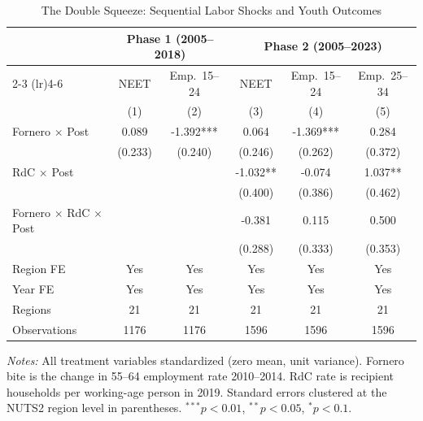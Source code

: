 \begin{table}[t]
\centering
\caption{The Double Squeeze: Sequential Labor Shocks and Youth Outcomes}
\label{tab:main}
\begin{threeparttable}
\begin{tabular}{lccccc}
\toprule
 & \multicolumn{2}{c}{Phase 1 (2005--2018)} & \multicolumn{3}{c}{Phase 2 (2005--2023)} \\
\cmidrule(lr){2-3} \cmidrule(lr){4-6}
 & NEET & Emp.~15--24 & NEET & Emp.~15--24 & Emp.~25--34 \\
 & (1) & (2) & (3) & (4) & (5) \\
\midrule
Fornero $\times$ Post & 0.089 & -1.392*** & 0.064 & -1.369*** & 0.284 \\
 & (0.233) & (0.240) & (0.246) & (0.262) & (0.372) \\
RdC $\times$ Post & &  & -1.032** & -0.074 & 1.037** \\
 & &  & (0.400) & (0.386) & (0.462) \\
Fornero $\times$ RdC $\times$ Post & &  & -0.381 & 0.115 & 0.500 \\
 & &  & (0.288) & (0.333) & (0.353) \\
\midrule
Region FE & Yes & Yes & Yes & Yes & Yes \\
Year FE & Yes & Yes & Yes & Yes & Yes \\
Regions & 21 & 21 & 21 & 21 & 21 \\
Observations & 1176 & 1176 & 1596 & 1596 & 1596 \\
\bottomrule
\end{tabular}
\begin{tablenotes}[flushleft]
\small
\item \textit{Notes:} All treatment variables standardized (zero mean, unit variance). Fornero bite is the change in 55--64 employment rate 2010--2014. RdC rate is recipient households per working-age person in 2019. Standard errors clustered at the NUTS2 region level in parentheses. $^{***}p<0.01$, $^{**}p<0.05$, $^{*}p<0.1$.
\end{tablenotes}
\end{threeparttable}
\end{table}

